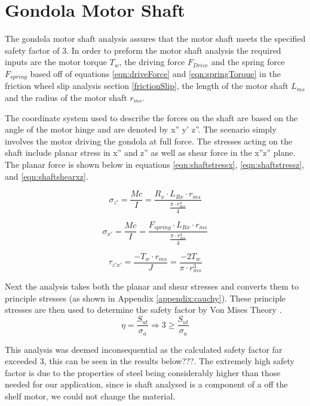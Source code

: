 \documentclass[../main.tex]{subfiles}
\begin{document}
\section{Gondola Motor Shaft} \label{motorShaft}
The gondola motor shaft analysis assures that the motor shaft meets the specified safety factor of 3. In order to preform the motor shaft analysis the required inputs are the motor torque $T_w$, the driving force $F_{Drive}$ and the spring force $F_{spring}$ based off of equations \ref{eqn:driveForce} and \ref{eqn:springTorque} in the friction wheel slip analysis section \ref{frictionSlip}, the length of the motor shaft $L_{ms}$ and the radius of the motor shaft $r_{ms}$.

The coordinate system used to describe the forces on the shaft are based on the angle of the motor hinge and are denoted by  x'' y' z''. The scenario simply involves the motor driving the gondola at full force. The stresses acting on the shaft include planar stress in x'' and z'' as well as shear force in the x''z'' plane. The planar force is shown below in equations  \ref{eqn:shaftstressx}, \ref{eqn:shaftstressz}, and \ref{eqn:shaftshearxz}.

\begin{equation} \label{eqn:shaftstressz}
\sigma_{z'}=\frac{Mc}{I}=\frac{R_{x}\cdot{}L_{Rx}\cdot{}r_{ms}}{\frac{\pi\cdot{}r_{ms}^4}{4}}
\end{equation}

\begin{equation} 
\label{eqn:shaftstressx}
\sigma_{x'}=\frac{Mc}{I}=\frac{F_{spring}\cdot{}L_{Rx}\cdot{}r_{ms}}{\frac{\pi\cdot{}r_{ms}^4}{4}}
\end{equation}

\begin{equation}
\label{eqn:shaftshearxz}
\tau_{z'x'} = \frac{-T_w\cdot{}r_{ms}}{J} = \frac{-2T_w}{\pi\cdot{}r_{ms}^3}
\end{equation}

Next the analysis takes both the planar and shear stresses and converts them to principle stresses (as shown in Appendix \ref{appendix:cauchy}). These principle stresses are then used to determine the safety factor by Von Mises Theory \cite[221]{shigley}. 
\begin{equation}
\eta = \dfrac{S_{ut}}{\sigma _a} \Rightarrow 3 \geq \dfrac{S_{ut}}{\sigma _a}
\end{equation}

This analysis was deemed inconsequential as the calculated safety factor far exceeded 3, this can be seen in the results below???. The extremely high safety factor is due to the properties of steel being considerably higher than those needed for our application, since is shaft analysed is a component of a off the shelf motor, we could not change the material. 
\end{document}
